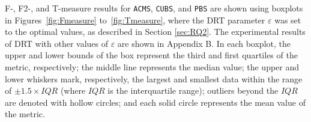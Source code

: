 \documentclass[10pt,journal,compsoc]{IEEEtran}
\begin{document}
F-, F2-, and T-measure results for \texttt{ACMS}, \texttt{CUBS}, and \texttt{PBS} are shown using boxplots in
Figures~\ref{fig:Fmeasure} to~\ref{fig:Tmeasure}, where the DRT parameter $\varepsilon$ was set to the optimal values, as described in Section \ref{sec:RQ2}. The experimental results of DRT with other values of $\varepsilon$ are shown in Appendix B.
In each boxplot, the upper and lower bounds of the box represent the third and first quartiles of the metric, respectively;
the middle line represents the median value;
the upper and lower whiskers mark, respectively, the largest and smallest data within the range of $\pm 1.5 \times IQR$ (where $IQR$ is the interquartile range);
outliers beyond the  $IQR$ are denoted with hollow circles; and
each solid circle represents the mean value of the metric.
\begin{figure}
	\centering

\end{figure}
\end{document}

